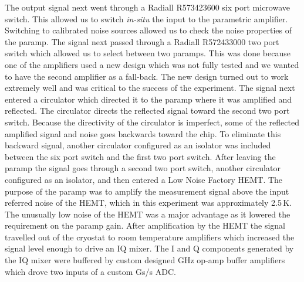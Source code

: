 The output signal next went through a Radiall R573423600 six port microwave switch.
This allowed us to switch \textit{in-situ} the input to the parametric amplifier.
Switching to calibrated noise sources allowed us to check the noise properties of the paramp.
The signal next passed through a Radiall R572433000 two port switch which allowed us to select between two paramps.
This was done because one of the amplifiers used a new design which was not fully tested and we wanted to have the second amplifier as a fall-back.
The new design turned out to work extremely well and was critical to the success of the experiment.
The signal next entered a circulator which directed it to the paramp where it was amplified and reflected.
The circulator directs the reflected signal toward the second two port switch.
Because the directivity of the circulator is imperfect, some of the reflected amplified signal and noise goes backwards toward the chip.
To eliminate this backward signal, another circulator configured as an isolator was included between the six port switch and the first two port switch.
After leaving the paramp the signal goes through a second two port switch, another circulator configured as an isolator, and then entered a Low Noise Factory HEMT.
The purpose of the paramp was to amplify the measurement signal above the input referred noise of the HEMT, which in this experiment was approximately 2.5\,K.
The unusually low noise of the HEMT was a major advantage as it lowered the requirement on the paramp gain.
After amplification by the HEMT the signal travelled out of the cryostat to room temperature amplifiers which increased the signal level enough to drive an IQ mixer.
The I and Q components generated by the IQ mixer were buffered by custom designed GHz op-amp buffer amplifiers which drove two inputs of a custom Gs/s ADC.
